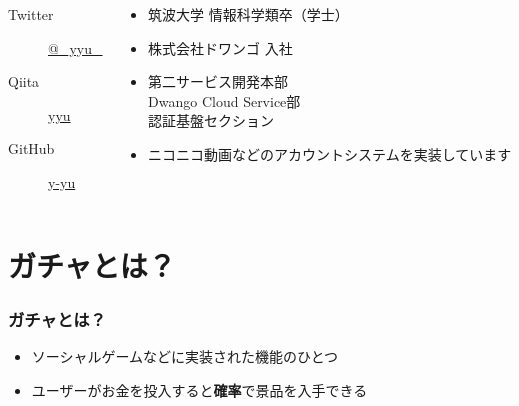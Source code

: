 \begin{frame}
\begin{columns}
\begin{column}{0.4\textwidth}
      \begin{description}
        \item[Twitter] \href{https://twitter.com/\_yyu\_}{@\_yyu\_}
        \item[Qiita] \href{https://qiita.com/yyu}{yyu}
        \item[GitHub] \href{https://github.com/y-yu}{y-yu}
      \end{description}
    \end{column}
    \begin{column}{0.6\textwidth}
      \begin{itemize}
        \item<2-> 筑波大学 情報科学類卒（学士）
        \item<3-> 株式会社ドワンゴ 入社
        \item<4-> 第二サービス開発本部 \\
          Dwango Cloud Service部 \\
          認証基盤セクション
        \item<5-> ニコニコ動画などのアカウントシステムを実装しています
      \end{itemize}
    \end{column}
  \end{columns}
\end{frame}

\section{ガチャとは？}

\begin{frame}
  \frametitle{ガチャとは？}

  \begin{itemize}
    \item<2-> ソーシャルゲームなどに実装された機能のひとつ
    \item<3-> ユーザーがお金を投入すると\textbf{確率}で景品を入手できる
  \end{itemize}

  \begin{center}


  \end{center}
\end{frame}


